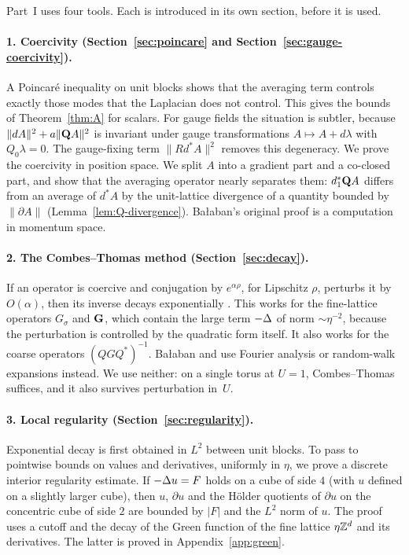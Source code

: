 Part~I uses four tools. Each is introduced in its own section, before it is used.

\paragraph{1. Coercivity (Section~\ref{sec:poincare} and Section~\ref{sec:gauge-coercivity}).} A Poincar\'e inequality on unit blocks shows that the averaging term controls exactly those modes that the Laplacian does not control. This gives the bounds of Theorem~\ref{thm:A} for scalars. For gauge fields the situation is subtler, because $\|dA\|^2+a\|\mathbf Q A\|^2$ is invariant under gauge transformations $A\mapsto A+d\lambda$ with $Q_0\lambda=0$. The gauge-fixing term $\|Rd^*A\|^2$ removes this degeneracy. We prove the coercivity in position space. We split $A$ into a gradient part and a co-closed part, and show that the averaging operator nearly separates them: $d_1^*\mathbf Q A$ differs from an average of $d^*A$ by the unit-lattice divergence of a quantity bounded by $\|\partial A\|$ (Lemma~\ref{lem:Q-divergence}). Ba\l aban's original proof \cite{BalPropI} is a computation in momentum space.

\paragraph{2. The Combes--Thomas method (Section~\ref{sec:decay}).} If an operator is coercive and conjugation by $e^{\alpha\rho}$, for Lipschitz $\rho$, perturbs it by $O(\alpha)$, then its inverse decays exponentially \cite{CT}. This works for the fine-lattice operators $G_\sigma$ and $\mathbf G$, which contain the large term $-\Delta$ of norm $\sim\eta^{-2}$, because the perturbation is controlled by the quadratic form itself. It also works for the coarse operators $(QGQ^*)^{-1}$. Ba\l aban and \cite{DST1} use Fourier analysis or random-walk expansions instead. We use neither: on a single torus at $U=1$, Combes--Thomas suffices, and it also survives perturbation in~$U$.

\paragraph{3. Local regularity (Section~\ref{sec:regularity}).} Exponential decay is first obtained in $L^2$ between unit blocks. To pass to pointwise bounds on values and derivatives, uniformly in $\eta$, we prove a discrete interior regularity estimate. If $-\Delta u=F$ holds on a cube of side $4$ (with $u$ defined on a slightly larger cube), then $u$, $\partial u$ and the H\"older quotients of $\partial u$ on the concentric cube of side $2$ are bounded by $|F|$ and the $L^2$ norm of $u$. The proof uses a cutoff and the decay of the Green function of the fine lattice $\eta\mathbb Z^d$ and its derivatives. The latter is proved in Appendix~\ref{app:green}.

